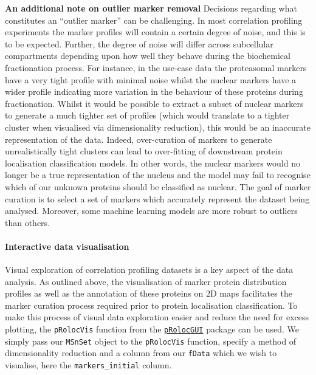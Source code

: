 \documentclass[9pt,a4paper,]{extarticle}
\begin{document}
\textbf{An additional note on outlier marker removal}
Decisions regarding what constitutes an ``outlier marker'' can be challenging. In
most correlation profiling experiments the marker profiles will contain a
certain degree of noise, and this is to be expected. Further, the degree of noise
will differ across subcellular compartments depending upon how well they behave
during the biochemical fractionation process. For instance, in the use-case data
the proteasomal markers have a very tight profile with minimal noise whilst the
nuclear markers have a wider profile indicating more variation in the behaviour
of these proteins during fractionation. Whilst it would be possible to extract a
subset of nuclear markers to generate a much tighter set of profiles (which would
translate to a tighter cluster when visualised via dimensionality reduction),
this would be an inaccurate representation of the data. Indeed, over-curation of
markers to generate unrealistically tight clusters can lead to over-fitting of
downstream protein localisation classification models. In other words, the
nuclear markers would no longer be a true representation of the nucleus and the
model may fail to recognise which of our unknown proteins should be classified
as nuclear. The goal of marker curation is to select a set of markers which
accurately represent the dataset being analysed. Moreover, some machine learning
models are more robust to outliers than others.

\paragraph{Interactive data visualisation}\label{interactive-data-visualisation}

Visual exploration of correlation profiling datasets is a key aspect of the data
analysis. As outlined above, the visualisation of marker protein distribution
profiles as well as the annotation of these proteins on 2D maps facilitates the
marker curation process required prior to protein localisation classification.
To make this process of visual data exploration easier and reduce the need for
excess plotting, the \texttt{pRolocVis} function from the \href{https://bioconductor.org/packages/release/bioc/html/pRolocGUI.html}{\texttt{pRolocGUI}}
package can be used. We simply pass our \texttt{MSnSet} object to the \texttt{pRolocVis}
function, specify a method of dimensionality reduction and a column from our
\texttt{fData} which we wish to visualise, here the \texttt{markers\_initial} column.
\end{document}
